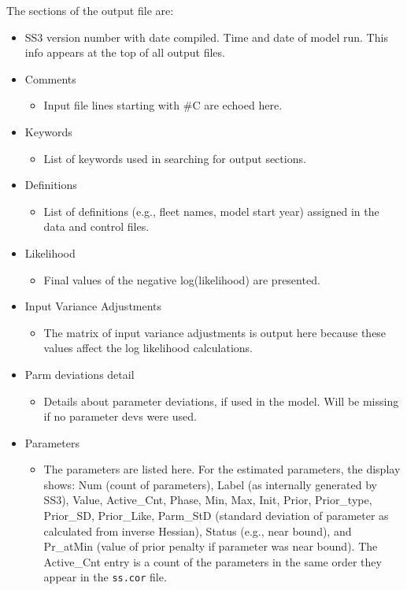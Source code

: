 The sections of the output file are:
\begin{itemize}
	\item SS3 version number with date compiled. Time and date of model run. This info appears at the top of all output files.
	\item Comments
		\begin{itemize}
			\item Input file lines starting with \#C are echoed here.
		\end{itemize}
	\item Keywords
		\begin{itemize}
			\item List of keywords used in searching for output sections.
		\end{itemize}
	\item Definitions
		\begin{itemize}
			\item List of definitions (e.g., fleet names, model start year) assigned in the data and control files.
		\end{itemize}
	\item Likelihood
		\begin{itemize}
			\item Final values of the negative log(likelihood) are presented.
		\end{itemize}
	\item Input Variance Adjustments
		\begin{itemize}
			\item The matrix of input variance adjustments is output here because these values affect the log likelihood calculations.
		\end{itemize}
	\item{Parm deviations detail}
	    \begin{itemize}
		    \item Details about parameter deviations, if used in the model. Will be missing if no parameter devs were used.
		\end{itemize}
	\item Parameters
		\begin{itemize}
			\item The parameters are listed here. For the estimated parameters, the display shows: Num (count of parameters), Label (as internally generated by SS3), Value, Active\_Cnt, Phase, Min, Max, Init, Prior, Prior\_type, Prior\_SD, Prior\_Like, Parm\_StD (standard deviation of parameter as calculated from inverse Hessian), Status (e.g., near bound), and Pr\_atMin (value of prior penalty if parameter was near bound). The Active\_Cnt entry is a count of the parameters in the same order they appear in the \texttt{ss.cor} file.

\end{itemize}
\end{itemize}
